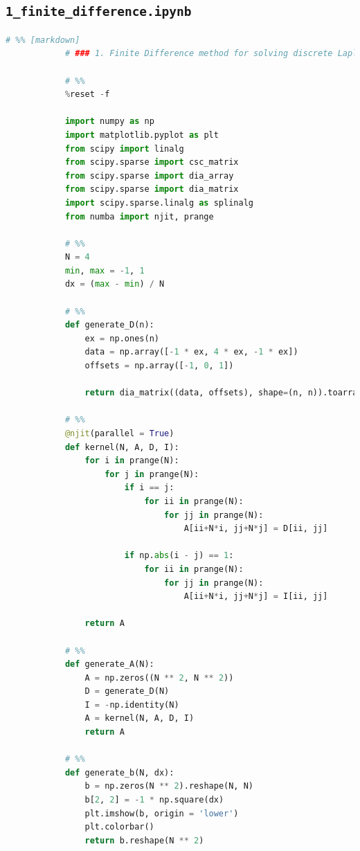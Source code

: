 \documentclass[12pt]{article}
\begin{document}
    \subsection{\texttt{1\_finite\_difference.ipynb}}
        \begin{lstlisting}[language={Python}]
            # %% [markdown]
            # ### 1. Finite Difference method for solving discrete Laplace Equation
            
            # %%
            %reset -f
            
            import numpy as np
            import matplotlib.pyplot as plt
            from scipy import linalg
            from scipy.sparse import csc_matrix
            from scipy.sparse import dia_array
            from scipy.sparse import dia_matrix
            import scipy.sparse.linalg as splinalg
            from numba import njit, prange
            
            # %%
            N = 4
            min, max = -1, 1
            dx = (max - min) / N
            
            # %%
            def generate_D(n):
                ex = np.ones(n)
                data = np.array([-1 * ex, 4 * ex, -1 * ex])
                offsets = np.array([-1, 0, 1])
                
                return dia_matrix((data, offsets), shape=(n, n)).toarray()
            
            # %%
            @njit(parallel = True)
            def kernel(N, A, D, I):
                for i in prange(N):
                    for j in prange(N):
                        if i == j:
                            for ii in prange(N):
                                for jj in prange(N):
                                    A[ii+N*i, jj+N*j] = D[ii, jj]
                                    
                        if np.abs(i - j) == 1:
                            for ii in prange(N):
                                for jj in prange(N):
                                    A[ii+N*i, jj+N*j] = I[ii, jj]
                                    
                return A
            
            # %%
            def generate_A(N):
                A = np.zeros((N ** 2, N ** 2))
                D = generate_D(N)
                I = -np.identity(N)
                A = kernel(N, A, D, I)
                return A
            
            # %%
            def generate_b(N, dx):
                b = np.zeros(N ** 2).reshape(N, N)
                b[2, 2] = -1 * np.square(dx)
                plt.imshow(b, origin = 'lower')
                plt.colorbar()
                return b.reshape(N ** 2)
            

\end{lstlisting}
\end{document}
